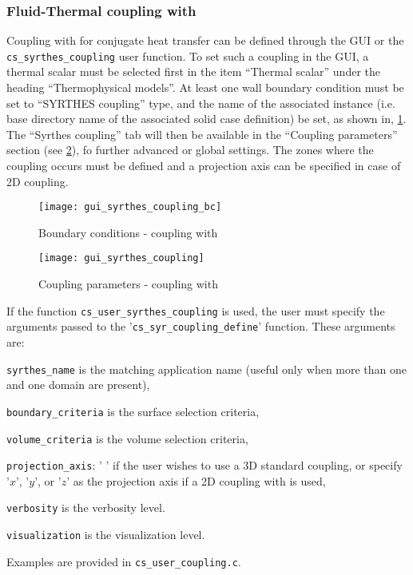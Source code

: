 \subsubsection{Fluid-Thermal coupling with \syrthes}
Coupling \CS with \syrthes for conjugate heat transfer can be defined through
the GUI or the \texttt{cs\_syrthes\_coupling} user function.
To set such a coupling in the GUI, a thermal scalar must be
selected first in the item ``Thermal scalar'' under the heading ``Thermophysical models''.
At least one wall boundary condition must be set to ``SYRTHES coupling'' type, and
the name of the associated \syrthes instance (i.e. base directory name of the associated
solid case definition) be set, as shown in, \figurename\ref{fig:syrthes_bc}.
The ``Syrthes coupling'' tab will then be available in the ``Coupling parameters''
section (see \figurename\ref{fig:syrthes}), fo further advanced or global settings.
The zones where the coupling occurs must be defined and a projection axis can be
specified in case of 2D coupling.

\begin{figure}[ht]
\begin{center}
\texttt{[image: gui\_syrthes\_coupling\_bc]}
\caption{Boundary conditions - coupling with \syrthes}
\label{fig:syrthes_bc}
\end{center}
\end{figure}

\begin{figure}[ht]
\begin{center}
\texttt{[image: gui\_syrthes\_coupling]}
\caption{Coupling parameters - coupling with \syrthes}
\label{fig:syrthes}
\end{center}
\end{figure}

If the function \texttt{cs\_user\_syrthes\_coupling} is used, the user must
specify the arguments passed to the '\texttt{cs\_syr\_coupling\_define}' function.
 These arguments are:
\begin{list}{-}{}
 \item \texttt{syrthes\_name} is the matching \syrthes application name (useful only when more than one \syrthes and one \CS domain are present),
 \item \texttt{boundary\_criteria} is the surface selection criteria,
 \item \texttt{volume\_criteria} is the volume selection criteria,
 \item \texttt{projection\_axis}: ' ' if the user wishes to use a 3D standard coupling,
 or specify '$x$', '$y$', or '$z$' as the projection axis if a 2D coupling with \syrthes is used,
 \item \texttt{verbosity} is the verbosity level.
 \item \texttt{visualization} is the visualization level.
\end{list}
Examples are provided in \texttt{cs\_user\_coupling.c}.

